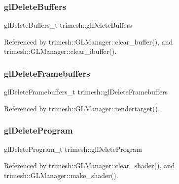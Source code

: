 \mbox{\label{namespacetrimesh_a289f75d8266249bd762435db1066de05}} 
\subsubsection{\texorpdfstring{gl\+Delete\+Buffers}{glDeleteBuffers}}
{\footnotesize\ttfamily gl\+Delete\+Buffers\+\_\+t trimesh\+::gl\+Delete\+Buffers\hspace{0.3cm}{\ttfamily [static]}}



Referenced by trimesh\+::\+G\+L\+Manager\+::clear\+\_\+buffer(), and trimesh\+::\+G\+L\+Manager\+::clear\+\_\+ibuffer().

\mbox{\label{namespacetrimesh_adb592b8b605c335d4626bed7524765d7}} 
\subsubsection{\texorpdfstring{gl\+Delete\+Framebuffers}{glDeleteFramebuffers}}
{\footnotesize\ttfamily gl\+Delete\+Framebuffers\+\_\+t trimesh\+::gl\+Delete\+Framebuffers\hspace{0.3cm}{\ttfamily [static]}}



Referenced by trimesh\+::\+G\+L\+Manager\+::rendertarget().

\mbox{\label{namespacetrimesh_abe8fc73d863458a17fd4203bf277687c}} 
\subsubsection{\texorpdfstring{gl\+Delete\+Program}{glDeleteProgram}}
{\footnotesize\ttfamily gl\+Delete\+Program\+\_\+t trimesh\+::gl\+Delete\+Program\hspace{0.3cm}{\ttfamily [static]}}



Referenced by trimesh\+::\+G\+L\+Manager\+::clear\+\_\+shader(), and trimesh\+::\+G\+L\+Manager\+::make\+\_\+shader().

